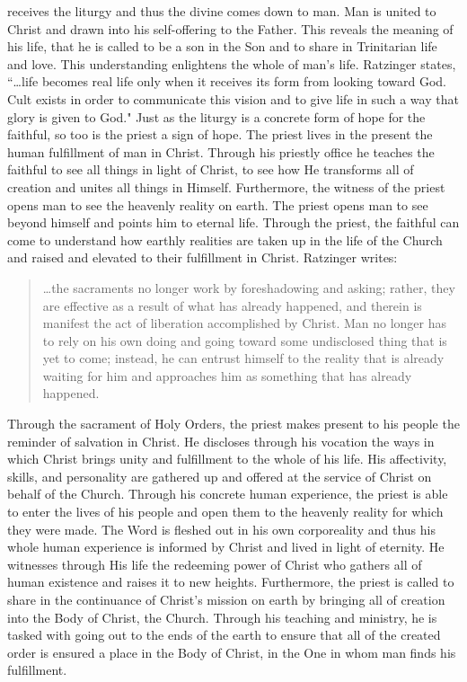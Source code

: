 \documentclass[twoside,10pt]{article}
\begin{document}
receives the liturgy and thus the divine comes down to man. Man is united to Christ and drawn into his self-offering to the Father. This reveals the meaning of his life, that he is called to be a son in the Son and to share in Trinitarian life and love. This understanding enlightens the whole of man’s life. Ratzinger states, ``…life becomes real life only when it receives its form from looking toward God. Cult exists in order to communicate this vision and to give life in such a way that glory is given to God."\autocite[18]{rat4} Just as the liturgy is a concrete form of hope for the faithful, so too is the priest a sign of hope. The priest lives in the present the human fulfillment of man in Christ. Through his priestly office he teaches the faithful to see all things in light of Christ, to see how He transforms all of creation and unites all things in Himself. Furthermore, the witness of the priest opens man to see the heavenly reality on earth. The priest opens man to see beyond himself and points him to eternal life. Through the priest, the faithful can come to understand how earthly realities are taken up in the life of the Church and raised and elevated to their fulfillment in Christ. Ratzinger writes:

\begin{quote}
	…the sacraments no longer work by foreshadowing and asking; rather, they are effective as a result of what has already happened, and therein is manifest the act of liberation accomplished by Christ. Man no longer has to rely on his own doing and going toward some undisclosed thing that is yet to come; instead, he can entrust himself to the reality that is already waiting for him and approaches him as something that has already happened.\autocite[180]{rat2}
\end{quote}

Through the sacrament of Holy Orders, the priest makes present to his people the reminder of salvation in Christ. He discloses through his vocation the ways in which Christ brings unity and fulfillment to the whole of his life. His affectivity, skills, and personality are gathered up and offered at the service of Christ on behalf of the Church. Through his concrete human experience, the priest is able to enter the lives of his people and open them to the heavenly reality for which they were made. The Word is fleshed out in his own corporeality and thus his whole human experience is informed by Christ and lived in light of eternity. He witnesses through His life the redeeming power of Christ who gathers all of human existence and raises it to new heights. Furthermore, the priest is called to share in the continuance of Christ’s mission on earth by bringing all of creation into the Body of Christ, the Church. Through his teaching and ministry, he is tasked with going out to the ends of the earth to ensure that all of the created order is ensured a place in the Body of Christ, in the One in whom man finds his fulfillment. 
\end{document}
